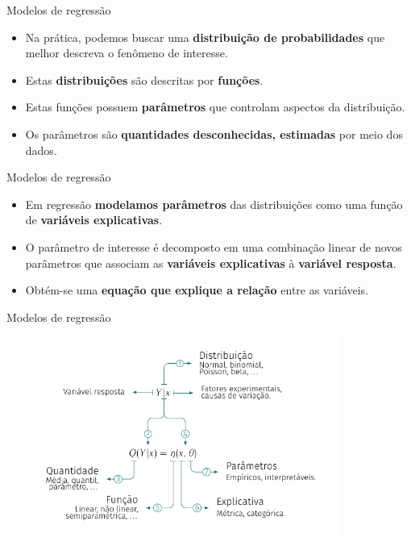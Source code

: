 \documentclass[
  ignorenonframetext,
  serif,
  professionalfont,
  usenames,
  dvipsnames,
  aspectratio = 169]{beamer}
\begin{document}
\begin{frame}{Modelos de regressão}
\protect\hypertarget{modelos-de-regressuxe3o-2}{}
\begin{itemize}
\item
  Na prática, podemos buscar uma \textbf{distribuição de probabilidades}
  que melhor descreva o fenômeno de interesse.
\item
  Estas \textbf{distribuições} são descritas por \textbf{funções}.
\item
  Estas funções possuem \textbf{parâmetros} que controlam aspectos da
  distribuição.
\item
  Os parâmetros são \textbf{quantidades desconhecidas, estimadas} por
  meio dos dados.
\end{itemize}
\end{frame}

\begin{frame}{Modelos de regressão}
\protect\hypertarget{modelos-de-regressuxe3o-3}{}
\begin{itemize}
\item
  Em regressão \textbf{modelamos parâmetros} das distribuições como uma
  função de \textbf{variáveis explicativas}.
\item
  O parâmetro de interesse é decomposto em uma combinação linear de
  novos parâmetros que associam as \textbf{variáveis explicativas} à
  \textbf{variável resposta}.
\item
  Obtém-se uma \textbf{equação que explique a relação} entre as
  variáveis.
\end{itemize}
\end{frame}

\begin{frame}{Modelos de regressão}
\protect\hypertarget{modelos-de-regressuxe3o-4}{}
\begin{center}\includegraphics[width=11cm]{./img/modelos_regressao} \end{center}
\end{frame}
\end{document}
